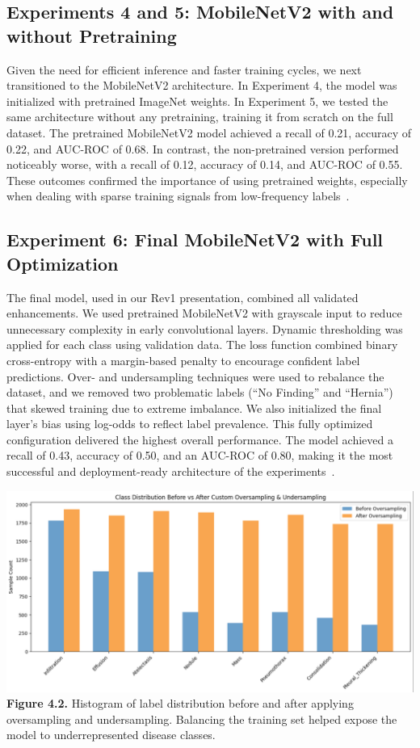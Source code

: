 \documentclass[12pt]{article}
\begin{document}
\begin{multicols}{2}
\subsection{Experiments 4 and 5: MobileNetV2 with and without Pretraining}

Given the need for efficient inference and faster training cycles, we next transitioned to the MobileNetV2 architecture. In Experiment 4, the model was initialized with pretrained ImageNet weights. In Experiment 5, we tested the same architecture without any pretraining, training it from scratch on the full dataset.
The pretrained MobileNetV2 model achieved a recall of 0.21, accuracy of 0.22, and AUC-ROC of 0.68. In contrast, the non-pretrained version performed noticeably worse, with a recall of 0.12, accuracy of 0.14, and AUC-ROC of 0.55. These outcomes confirmed the importance of using pretrained weights, especially when dealing with sparse training signals from low-frequency labels~\cite{howard2019mobilenetv2}.

\subsection{Experiment 6: Final MobileNetV2 with Full Optimization}

The final model, used in our Rev1 presentation, combined all validated enhancements. We used pretrained MobileNetV2 with grayscale input to reduce unnecessary complexity in early convolutional layers. Dynamic thresholding was applied for each class using validation data. The loss function combined binary cross-entropy with a margin-based penalty to encourage confident label predictions. Over- and undersampling techniques were used to rebalance the dataset, and we removed two problematic labels (“No Finding” and “Hernia”) that skewed training due to extreme imbalance. We also initialized the final layer’s bias using log-odds to reflect label prevalence.
This fully optimized configuration delivered the highest overall performance. The model achieved a recall of 0.43, accuracy of 0.50, and an AUC-ROC of 0.80, making it the most successful and deployment-ready architecture of the experiments~\cite{13}.

\begin{center}
    \includegraphics[width=\linewidth]{figure4.2.png}
    \textbf{Figure 4.2.} Histogram of label distribution before and after applying oversampling and undersampling. Balancing the training set helped expose the model to underrepresented disease classes.
\end{center}


\end{multicols}
\end{document}
